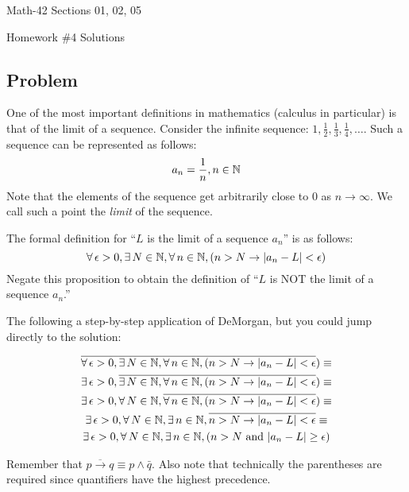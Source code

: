 \documentclass[letterpaper,12pt,fleqn]{article}
\newcommand{\e}{\epsilon}
\renewcommand{\implies}{\rightarrow}
\begin{document}
\begin{center}
  \large
  Math-42 Sections 01, 02, 05

  \Large
  Homework \#4 Solutions
\end{center}

\subsection*{Problem}

One of the most important definitions in mathematics (calculus in particular) is that of the limit of a sequence.
Consider the infinite sequence: \(1,\frac{1}{2},\frac{1}{3},\frac{1}{4},\ldots\).  Such a sequence can be
represented as follows:
\[a_n=\frac{1}{n}, n\in\mathbb{N}\]
Note that the elements of the sequence get arbitrarily close to \(0\) as \(n\to\infty\).  We call such a point the
\emph{limit} of the sequence.

The formal definition for ``\(L\) is the limit of a sequence \(a_n\)'' is as follows:
\[\forall\,\e>0,\exists\,N\in\N,\forall\,n\in\N,(n>N\implies\abs{a_n-L}<\e)\]
Negate this proposition to obtain the definition of ``\(L\) is NOT the limit of a sequence \(a_n\).''

The following a step-by-step application of DeMorgan, but you could jump directly to the solution:

\begin{gather*}
\overline{\forall\,\e>0,\exists\,N\in\N,\forall\,n\in\N,(n>N\implies\abs{a_n-L}<\e})\equiv \\
\exists\,\e>0,\overline{\exists\,N\in\N,\forall\,n\in\N,(n>N\implies\abs{a_n-L}<\e})\equiv \\
\exists\,\e>0,\forall\,N\in\N,\overline{\forall\,n\in\N,(n>N\implies\abs{a_n-L}<\e})\equiv \\
\exists\,\e>0,\forall\,N\in\N,\exists\,n\in\N,\overline{n>N\implies\abs{a_n-L}<\e}\equiv \\
\exists\,\e>0,\forall\,N\in\N,\exists\,n\in\N,(n>N\ \text{and}\ \abs{a_n-L}\ge\e)
\end{gather*}

Remember that \(\overline{p\implies q}\equiv p\land\bar{q}\).  Also note that technically the parentheses are
required since quantifiers have the highest precedence.
\end{document}

